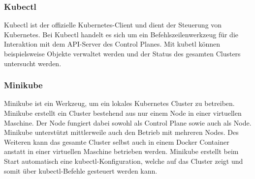 \subsubsection{Kubectl}

Kubectl ist der offizielle Kubernetes-Client und dient der Steuerung von Kubernetes. Bei Kubectl handelt es sich um ein Befehlszeilenwerkzeug für die Interaktion mit dem \ac{API}-Server des Control Planes. Mit kubetl können beispielsweise Objekte verwaltet werden und der Status des gesamten Clusters untersucht werden.

\subsubsection{Minikube}

Minikube ist ein Werkzeug, um ein lokales Kubernetes Cluster zu betreiben. Minikube erstellt ein Cluster bestehend aus nur einem Node in einer virtuellen Maschine. Der Node fungiert dabei sowohl als Control Plane sowie auch als Node. Minikube unterstützt mittlerweile auch den Betrieb mit mehreren Nodes. Des Weiteren kann das gesamte Cluster selbst auch in einem Docker Container anstatt in einer virtuellen Maschine betrieben werden. Minikube erstellt beim Start automatisch eine kubectl-Konfiguration, welche auf das Cluster zeigt und somit über kubectl-Befehle gesteuert werden kann. 